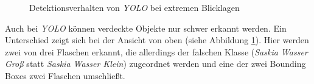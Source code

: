 \begin{figure}[H]
	\centering
	\hspace{2cm}
	\caption{Detektionsverhalten von \textit{YOLO} bei extremen Blicklagen}
	\label{lagen_yolo}
\end{figure}

Auch bei \textit{YOLO} können verdeckte Objekte nur schwer erkannt werden. Ein Unterschied zeigt sich bei der Ansicht von oben (siehe Abbildung \ref{lagen_yolo}). Hier werden zwei von drei Flaschen erkannt, die allerdings der falschen Klasse (\textit{Saskia Wasser Groß} statt \textit{Saskia Wasser Klein}) zugeordnet werden und eine der zwei Bounding Boxes zwei Flaschen umschließt.


